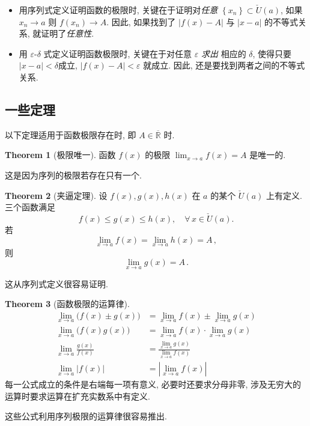 \documentclass{book}
\newcommand{\Any}{\forall\,}
\newcommand{\set}[1]{\left\{#1\right\}}
\newcommand{\exR}{\overline{\mathbb{R}}}
\newcommand{\abs}[1]{\left\lvert #1 \right\rvert}
\newcommand{\puncU}[1]{\check{U}\!\left( #1 \right)}
\renewcommand{\le}{\leqslant}
\numberwithin{equation}{section}
\numberwithin{figure}{section}
\theoremstyle{definition}
\newtheorem{theorem}{Theorem}[section]
\begin{document}
\begin{itemize}
  \item 用序列式定义证明函数的极限时, 关键在于证明对\emph{任意} $\set{x_n}\subset\puncU{a}$, 如果 $x_n\to a$ 则 $f(x_n)\to A$. 因此, 如果找到了 $\abs{f(x)-A}$ 与 $\abs{x-a}$ 的不等式关系, 就证明了\emph{任意性}.
  \item 用 $\varepsilon$-$\delta$ 式定义证明函数极限时, 关键在于对任意 $\varepsilon$ \emph{求出} 相应的 $\delta$, 使得只要 $\abs{x-a}<\delta$成立, $\abs{f(x)-A}<\varepsilon$ 就成立. 因此, 还是要找到两者之间的不等式关系.
\end{itemize}


\subsection{一些定理}
以下定理适用于函数极限存在时, 即 $A\in\exR$ 时.
\begin{theorem}[极限唯一]
  函数 $f(x)$ 的极限 $\lim_{x\to a}f(x)=A$ 是唯一的.
\end{theorem}
这是因为序列的极限若存在只有一个.

\begin{theorem}[夹逼定理]
  设 $f(x),g(x),h(x)$ 在 $a$ 的某个 $\puncU{a}$ 上有定义. 三个函数满足
  \begin{equation*}
    f(x)\le g(x)\le h(x),\quad\Any x\in\puncU{a}.
  \end{equation*}
  若
  \begin{equation*}
    \lim_{x\to a}f(x)=\lim_{x\to a}h(x)=A\,,
  \end{equation*}
  则
  \begin{equation*}
    \lim_{x\to a}g(x)=A\,.
  \end{equation*}
\end{theorem}
这从序列式定义很容易证明.

\begin{theorem}[函数极限的运算律]
  \begin{align*}
    \lim_{x\to a}\big(f(x)\pm g(x)\big)&=\lim_{x\to a}f(x)\pm\lim_{x\to a}g(x)\\
    \lim_{x\to a}\big(f(x)g(x)\big)&=\lim_{x\to a}f(x)\cdot\lim_{x\to a}g(x)\\
    \lim_{x\to a}\frac{g(x)}{f(x)}&=\frac{\displaystyle\lim_{x\to a}g(x)}{\displaystyle\lim_{x\to a}f(x)}\\
    \lim_{x\to a}\abs{f(x)}&=\abs{\lim_{x\to a}f(x)}
  \end{align*}
  每一公式成立的条件是右端每一项有意义, 必要时还要求分母非零, 涉及无穷大的运算时要求运算在扩充实数系中有定义.
\end{theorem}
这些公式利用序列极限的运算律很容易推出.
\end{document}
